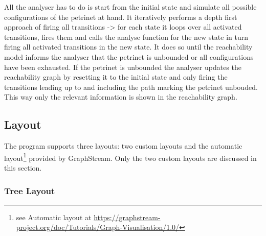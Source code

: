 \documentclass[10pt, a4paper]{article}
\begin{document}
All the analyser has to do is start from the initial state and simulate all possible configurations of the petrinet at hand. It iteratively performs a depth first approach of firing all transitions -> for each state it loops over all activated transitions, fires them and calls the analyse function for the new state in turn firing all activated transitions in the new state. It does so until the reachability model informs the analyser that the petrinet is unbounded or all configurations have been exhausted. If the petrinet is unbounded the analyser updates the reachability graph by resetting it to the initial state and only firing the transitions leading up to and including the path marking the petrinet unbouded. This way only the relevant information is shown in the reachability graph.


\subsection{Layout}
\label{label:layout}

The program supports three layouts: two custom layouts and the automatic layout\footnote{see Automatic layout at \url{https://graphstream-project.org/doc/Tutorials/Graph-Visualisation/1.0/}} provided by GraphStream. Only the two custom layouts are discussed in this section.

\subsubsection{Tree Layout}
\label{label:treeLayout}
\end{document}
